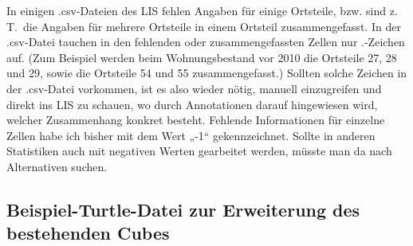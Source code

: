 \documentclass[a4paper,11pt]{article}
\begin{document}
In einigen .csv-Dateien des LIS fehlen Angaben für einige Ortsteile, bzw. sind
z.\,T.\ die Angaben für mehrere Ortsteile in einem Ortsteil zusammengefasst.
In der .csv-Datei tauchen in den fehlenden oder zusammengefassten Zellen nur
\dq.\dq-Zeichen auf. (Zum Beispiel werden beim Wohnungsbestand vor 2010 die
Ortsteile 27, 28 und 29, sowie die Ortsteile 54 und 55 zusammengefasst.)
Sollten solche Zeichen in der .csv-Datei vorkommen, ist es also wieder nötig,
manuell einzugreifen und direkt ins LIS zu schauen, wo durch Annotationen
darauf hingewiesen wird, welcher Zusammenhang konkret besteht. Fehlende
Informationen für einzelne Zellen habe ich bisher mit dem Wert „-1“
gekennzeichnet.  Sollte in anderen Statistiken auch mit negativen Werten
gearbeitet werden, müsste man da nach Alternativen suchen.

\subsection{Beispiel-Turtle-Datei zur Erweiterung des bestehenden Cubes}
\end{document}
